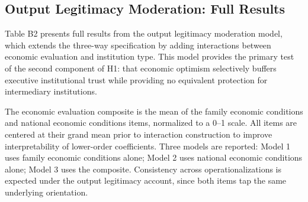 \documentclass[
  12pt,
  letterpaper]{article}
\begin{document}
\subsection{Output Legitimacy Moderation: Full
Results}\label{sec-output-legitimacy-full}

Table B2 presents full results from the output legitimacy moderation
model, which extends the three-way specification by adding interactions
between economic evaluation and institution type. This model provides
the primary test of the second component of H1: that economic optimism
selectively buffers executive institutional trust while providing no
equivalent protection for intermediary institutions.

The economic evaluation composite is the mean of the family economic
conditions and national economic conditions items, normalized to a 0--1
scale. All items are centered at their grand mean prior to interaction
construction to improve interpretability of lower-order coefficients.
Three models are reported: Model 1 uses family economic conditions
alone; Model 2 uses national economic conditions alone; Model 3 uses the
composite. Consistency across operationalizations is expected under the
output legitimacy account, since both items tap the same underlying
orientation.
\end{document}
